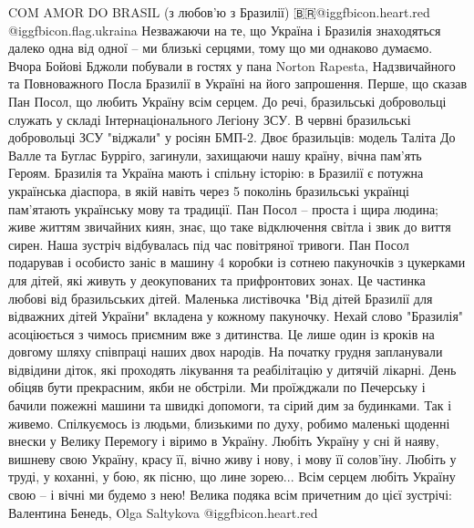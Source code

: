 COM AMOR DO BRASIL (з любов'ю з Бразилії)
🇧🇷@igg{fbicon.heart.red} @igg{fbicon.flag.ukraina}
Незважаючи на те, що Україна і Бразилія знаходяться далеко одна від одної -- ми  близькі серцями, тому що ми однаково думаємо.
Вчора Бойові Бджоли побували в гостях у пана Norton Rapesta, Надзвичайного та Повноважного Посла Бразилії в Україні на його запрошення.
Перше, що сказав Пан Посол, що любить Україну всім серцем.
До речі, бразильські добровольці служать у складі Інтернаціонального Легіону ЗСУ. В червні бразильські добровольці ЗСУ "віджали" у росіян БМП-2. Двоє бразильців: модель Таліта До Валле та Буглас Бурріго, загинули, захищаючи нашу країну, вічна пам'ять Героям.
Бразилія та Україна мають і спільну історію: в Бразилії є потужна українська діаспора, в якій навіть через 5 поколінь бразильські українці пам'ятають українську мову та традиції.
Пан Посол -- проста і щира людина; живе життям звичайних киян, знає, що таке відключення світла і звик до виття сирен.
Наша зустріч відбувалась під час повітряної тривоги.
Пан Посол подарував і особисто заніс в машину 4 коробки із сотнею пакуночків з цукерками для дітей, які живуть у деокупованих та прифронтових зонах. Це частинка любові від бразильських дітей. Маленька листівочка "Від дітей Бразилії для відважних дітей України" вкладена у кожному пакуночку. Нехай слово "Бразилія" асоціюється з чимось приємним вже з дитинства.
Це лише один із кроків на довгому шляху співпраці наших двох народів. На початку грудня запланували відвідини діток, які проходять лікування  та реабілітацію у  дитячій лікарні. 
День обіцяв бути прекрасним, якби не обстріли. Ми проїжджали по Печерську і бачили пожежні машини та швидкі допомоги, та сірий дим за будинками. 
Так і живемо. Спілкуємось із людьми, близькими по духу, робимо маленькі щоденні внески у Велику Перемогу і віримо в Україну. 
Любіть Україну у сні й наяву,
вишневу свою Україну,
красу її, вічно живу і нову,
і мову її солов'їну.
Любіть у труді, у коханні, у бою,
як пісню, що лине зорею...
Всім серцем любіть Україну свою -- 
і вічні ми будемо з нею!
Велика подяка всім причетним до цієї зустрічі: Валентина Бенедь, Olga Saltykova @igg{fbicon.heart.red}

